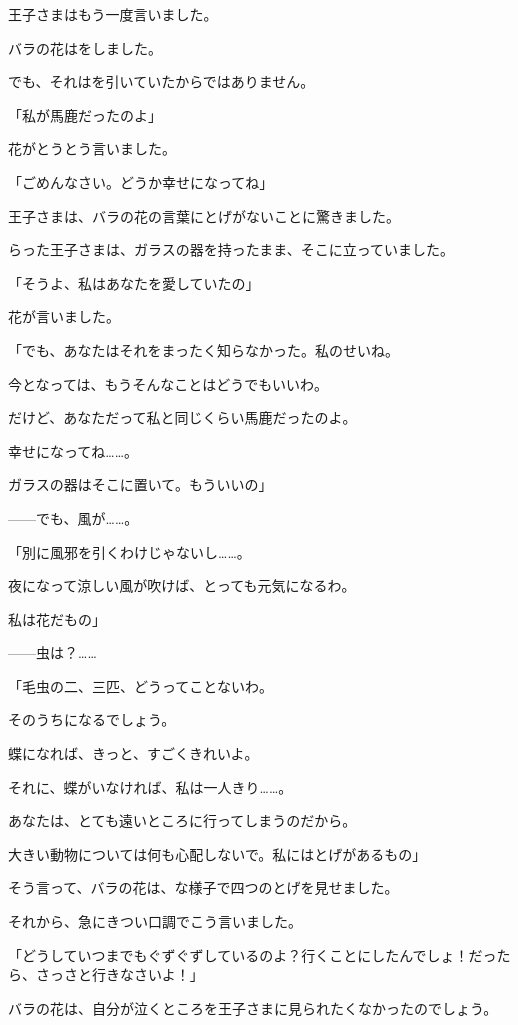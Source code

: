 王子さまはもう一度言いました。

バラの花はをしました。

でも、それはを引いていたからではありません。

「私が馬鹿だったのよ」

花がとうとう言いました。

「ごめんなさい。どうか幸せになってね」

王子さまは、バラの花の言葉にとげがないことに驚きました。

らった王子さまは、ガラスの器を持ったまま、そこに立っていました。

「そうよ、私はあなたを愛していたの」

花が言いました。

「でも、あなたはそれをまったく知らなかった。私のせいね。

今となっては、もうそんなことはどうでもいいわ。

だけど、あなただって私と同じくらい馬鹿だったのよ。

幸せになってね……。

ガラスの器はそこに置いて。もういいの」

——でも、風が……。

「別に風邪を引くわけじゃないし……。

夜になって涼しい風が吹けば、とっても元気になるわ。

私は花だもの」

——虫は？……

「毛虫の二、三匹、どうってことないわ。

そのうちになるでしょう。

蝶になれば、きっと、すごくきれいよ。

それに、蝶がいなければ、私は一人きり……。


あなたは、とても遠いところに行ってしまうのだから。

大きい動物については何も心配しないで。私にはとげがあるもの」

そう言って、バラの花は、な様子で四つのとげを見せました。

それから、急にきつい口調でこう言いました。

「どうしていつまでもぐずぐずしているのよ？行くことにしたんでしょ！だったら、さっさと行きなさいよ！」

バラの花は、自分が泣くところを王子さまに見られたくなかったのでしょう。

